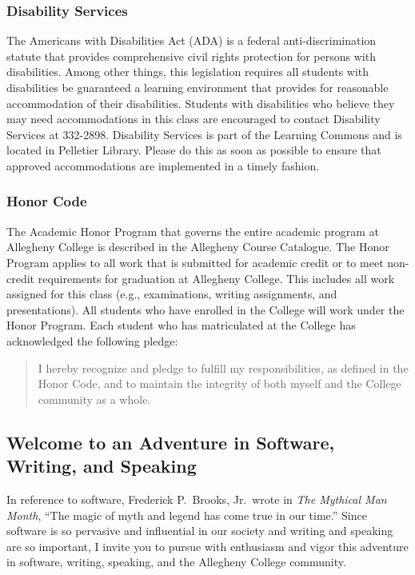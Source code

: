 \subsubsection*{Disability Services}

The Americans with Disabilities Act (ADA) is a federal anti-discrimination statute that provides comprehensive civil
rights protection for persons with disabilities.  Among other things, this legislation requires all students with
disabilities be guaranteed a learning environment that provides for reasonable accommodation of their disabilities.
Students with disabilities who believe they may need accommodations in this class are encouraged to contact Disability
Services at 332-2898.  Disability Services is part of the Learning Commons and is located in Pelletier Library.
Please do this as soon as possible to ensure that approved accommodations are implemented in a timely fashion.

\subsubsection*{Honor Code}

The Academic Honor Program that governs the entire academic program at Allegheny College is described in the Allegheny
Course Catalogue.  The Honor Program applies to all work that is submitted for academic credit or to meet non-credit
requirements for graduation at Allegheny College.  This includes all work assigned for this class (e.g., examinations,
writing assignments, and presentations).  All students who have enrolled in the College will work under the Honor
Program.  Each student who has matriculated at the College has acknowledged the following pledge:

\vspace*{-.125in}
\begin{quote}
  I hereby recognize and pledge to fulfill my responsibilities, as defined in the Honor Code, and to maintain the
  integrity of both myself and the College community as a whole.
\end{quote}
\vspace*{-.175in}

\subsection*{Welcome to an Adventure in Software, Writing, and Speaking}

In reference to software, Frederick P.\ Brooks, Jr.\ wrote in {\em The Mythical Man Month}, ``The magic of myth and legend has come
true in our time.'' Since software is so pervasive and influential in our society and writing and speaking are so important,
I invite you to pursue with enthusiasm and vigor this adventure in software, writing, speaking, and the Allegheny
College community.





%

